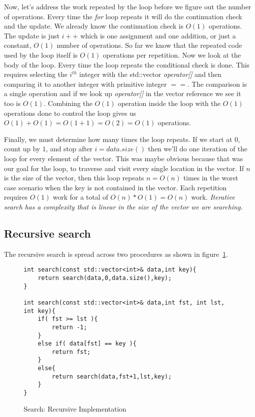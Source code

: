 \documentclass[]{tufte-handout}
\begin{document}
Now, let's address the work repeated by the loop before we figure out the number of operations.  Every time the \textit{for} loop repeats it will do the continuation check and the update.  We already know the continuation check is $O(1)$ operations. The update is just $i++$ which is one assignment and one addition, or just a constant, $O(1)$ number of operations. So far we know that the repeated code used by the loop itself is $O(1)$ operations per repetition. Now we look at the body of the loop. Every time the loop repeats the conditional check is done. This requires selecting the $i^{th}$ integer with the std::vector \textit{operator[]} and then comparing it to another integer with primitive integer $==$.  The comparison is a single operation and if we look up \textit{operator[]} in the vector reference we see it too is $O(1)$. Combining the $O(1)$ operation inside the loop with the $O(1)$ operations done to control the loop gives us $O(1)+O(1)=O(1 + 1)=O(2)=O(1)$ operations.

Finally, we must determine how many times the loop repeats. If we start at $0$, count up by $1$, and stop after $i = data.size()$ then we'll do one iteration of the loop for every element of the vector. This was maybe obvious because that was our goal for the loop, to traverse and visit every single location in the vector. If $n$ is the size of the vector, then this loop repeats $n = O(n)$ times in the worst case scenario when the key is not contained in the vector. Each repetition requires $O(1)$ work for a total of $O(n)*O(1) = O(n)$ work. \textit{Iterative search has a complexity that is linear in the size of the vector we are searching.}

\subsection{Recursive search}

The recursive search is spread across two procedures as shown in figure~\ref{code:searchrec}.

\begin{figure}[htpb!]
\begin{lstlisting}
int search(const std::vector<int>& data,int key){
	return search(data,0,data.size(),key);
}

int search(const std::vector<int>& data,int fst, int lst, int key){
	if( fst >= lst ){
		return -1;
	}
	else if( data[fst] == key ){
		return fst;
	}
	else{
		return search(data,fst+1,lst,key);
	}
}
\end{lstlisting}
\label{code:searchrec}
\caption{Search: Recursive Implementation}
\end{figure}
\end{document}
